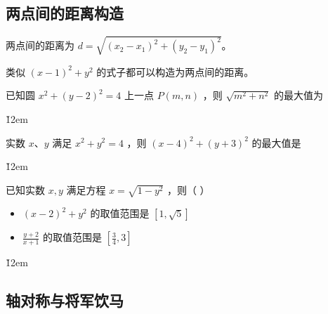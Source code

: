 \subsection{两点间的距离构造}

\begin{theorem}
    两点间的距离为 $d=\sqrt{(x_2-x_1)^2+(y_2-y_1)^2}$。

    类似 $(x-1)^2+y^2$ 的式子都可以构造为两点间的距离。
\end{theorem}

\begin{example}
    已知圆 $x^2+(y-2)^2=4$ 上一点 $P(m, n)$ ，则 $\sqrt{m^2+n^2}$ 的最大值为 \underline{\qquad}
\end{example}

\v{12em}

\begin{example}
    实数 $x$、$y$ 满足 $x^2+y^2=4$ ，则 $(x-4)^2+(y+3)^2$ 的最大值是 \underline{\qquad}
\end{example}

\v{12em}

\begin{example}
    已知实数 $x, y$ 满足方程 $x=\sqrt{1-y^2}$ ，则（ \qquad）
    \begin{itemize}
        \item $(x-2)^2+y^2$ 的取值范围是 $[1, \sqrt{5}]$
        \item $\frac{y+2}{x+1}$ 的取值范围是 $\left[\frac{3}{4}, 3\right]$
    \end{itemize}
\end{example}

\v{12em}


\subsection{轴对称与将军饮马}

